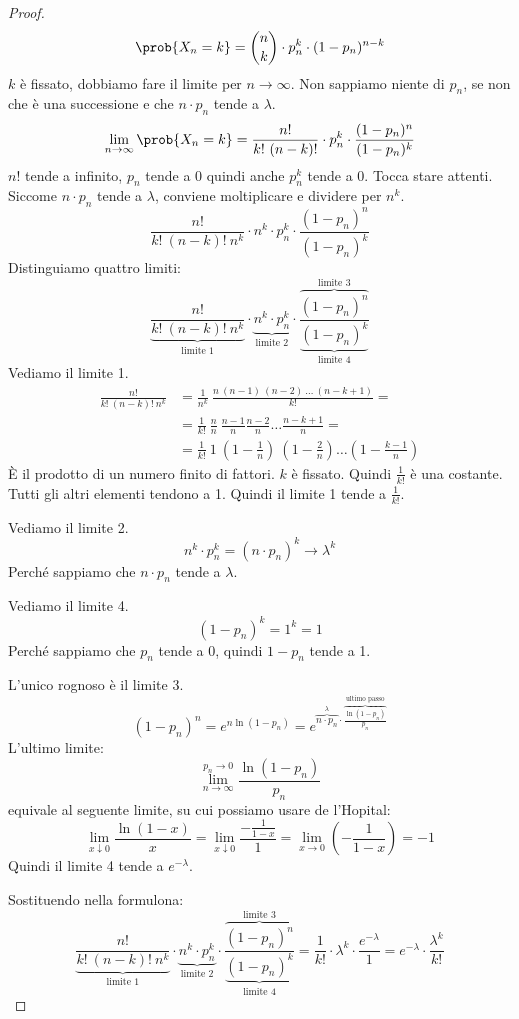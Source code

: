\begin{proof}
\[
\prob{X_n = k} = \binom{n}{k} \cdot p_n^k \cdot (1 - p_n)^{n-k}
\]
$k$ \`e fissato, dobbiamo fare il limite per $n \to \infty$. Non sappiamo niente di $p_n$, se non che \`e una successione e che $n \cdot p_n$ tende a $\lambda$.
\[
\lim_{n \to \infty} \prob{X_n = k} = \frac{n!}{k! \ (n-k)!} \cdot p_n^k \cdot \frac{(1-p_n)^n}{(1-p_n)^k}
\]
$n!$ tende a infinito, $p_n$ tende a 0 quindi anche $p_n^k$ tende a 0. Tocca stare attenti. Siccome $n \cdot p_n$ tende a $\lambda$, conviene moltiplicare e dividere per $n^k$.
\[
\frac{n!}{k! \ (n-k)! \ n^k} \cdot n^k \cdot p_n^k \cdot \frac{(1-p_n)^n}{(1-p_n)^k}
\]
Distinguiamo quattro limiti:
\[
\underbrace{\frac{n!}{k! \ (n-k)! \ n^k}}_{\text{limite 1}} \cdot \underbrace{n^k \cdot p_n^k}_{\text{limite 2}} \cdot \frac{\overbrace{(1-p_n)^n}^{\text{limite 3}}}{\underbrace{(1-p_n)^k}_{\text{limite 4}}}
\]
Vediamo il limite 1.
\begin{align*}
\frac{n!}{k! \ (n-k)! \ n^k} &= \frac{1}{n^k} \ \frac{n \ (n-1) \ (n-2) \ \ldots \ (n - k + 1)}{k!} = \\
&= \frac{1}{k!} \ \frac{n}{n} \ \frac{n - 1}{n} \frac{n-2}{n} \ldots \frac{n - k + 1}{n} = \\
&= \frac{1}{k!} \ 1 \ \left( 1 - \frac{1}{n} \right) \ \left( 1 - \frac{2}{n} \right) \ldots \left( 1 - \frac{k - 1}{n} \right)
\end{align*}
\`E il prodotto di un numero finito di fattori. $k$ \`e fissato. Quindi $\frac{1}{k!}$ \`e una costante. Tutti gli altri elementi tendono a 1. Quindi il limite 1 tende a $\frac{1}{k!}$.

Vediamo il limite 2.
\[
n^k \cdot p_n^k = (n \cdot p_n)^k \to \lambda^k
\]
Perch\'e sappiamo che $n \cdot p_n$ tende a $\lambda$.

Vediamo il limite 4.
\[
\left( 1 - p_n \right)^k = 1^k = 1
\]
Perch\'e sappiamo che $p_n$ tende a 0, quindi $1 - p_n$ tende a 1.

L'unico rognoso \`e il limite 3.
\[
\left( 1 - p_n \right)^n = e^{n \ln (1 - p_n)} = e^{\overbrace{n \cdot p_n}^{\lambda} \cdot \overbrace{\frac{\ln(1-p_n)}{p_n}}^{\text{ultimo passo}}}
\]
L'ultimo limite:
\[
\lim_{n \to \infty}^{p_n \to 0} \frac{\ln(1 - p_n)}{p_n}
\]
equivale al seguente limite, su cui possiamo usare de l'Hopital:
\[
\lim_{x \downarrow 0} \frac{\ln(1-x)}{x} = \lim_{x \downarrow 0} \frac{- \frac{1}{1 - x}}{1} = \lim_{x \to 0} \left( - \frac{1}{1 - x} \right) = -1
\]
Quindi il limite 4 tende a $e^{-\lambda}$.

Sostituendo nella formulona:
\[
\underbrace{\frac{n!}{k! \ (n-k)! \ n^k}}_{\text{limite 1}} \cdot \underbrace{n^k \cdot p_n^k}_{\text{limite 2}} \cdot \frac{\overbrace{(1-p_n)^n}^{\text{limite 3}}}{\underbrace{(1-p_n)^k}_{\text{limite 4}}} =
 \frac{1}{k!} \cdot \lambda^k \cdot \frac{e^{-\lambda}}{1} = e^{-\lambda} \cdot \frac{\lambda^k}{k!}
\]
\end{proof}

